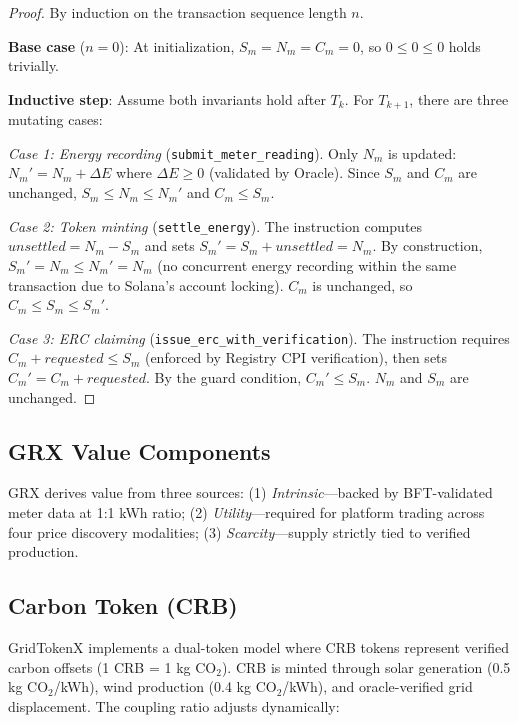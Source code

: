 \documentclass[conference]{IEEEtran}
\begin{document}
\begin{proof}
By induction on the transaction sequence length $n$.

\textbf{Base case} ($n = 0$): At initialization, $S_m = N_m = C_m = 0$, so $0 \leq 0 \leq 0$ holds trivially.

\textbf{Inductive step}: Assume both invariants hold after $T_k$. For $T_{k+1}$, there are three mutating cases:

\textit{Case 1: Energy recording} (\texttt{submit\_meter\_reading}). Only $N_m$ is updated: $N_m' = N_m + \Delta E$ where $\Delta E \geq 0$ (validated by Oracle). Since $S_m$ and $C_m$ are unchanged, $S_m \leq N_m \leq N_m'$ and $C_m \leq S_m$.

\textit{Case 2: Token minting} (\texttt{settle\_energy}). The instruction computes $\mathit{unsettled} = N_m - S_m$ and sets $S_m' = S_m + \mathit{unsettled} = N_m$. By construction, $S_m' = N_m \leq N_m' = N_m$ (no concurrent energy recording within the same transaction due to Solana's account locking). $C_m$ is unchanged, so $C_m \leq S_m \leq S_m'$.

\textit{Case 3: ERC claiming} (\texttt{issue\_erc\_with\_verification}). The instruction requires $C_m + \mathit{requested} \leq S_m$ (enforced by Registry CPI verification), then sets $C_m' = C_m + \mathit{requested}$. By the guard condition, $C_m' \leq S_m$. $N_m$ and $S_m$ are unchanged. \qedhere
\end{proof}

\subsection{GRX Value Components}

GRX derives value from three sources: (1) \textit{Intrinsic}---backed by BFT-validated meter data at 1:1 kWh ratio; (2) \textit{Utility}---required for platform trading across four price discovery modalities; (3) \textit{Scarcity}---supply strictly tied to verified production.

\subsection{Carbon Token (CRB)}

GridTokenX implements a dual-token model where CRB tokens represent verified carbon offsets (1 CRB = 1 kg CO$_2$). CRB is minted through solar generation (0.5 kg CO$_2$/kWh), wind production (0.4 kg CO$_2$/kWh), and oracle-verified grid displacement. The coupling ratio adjusts dynamically:
\end{document}
